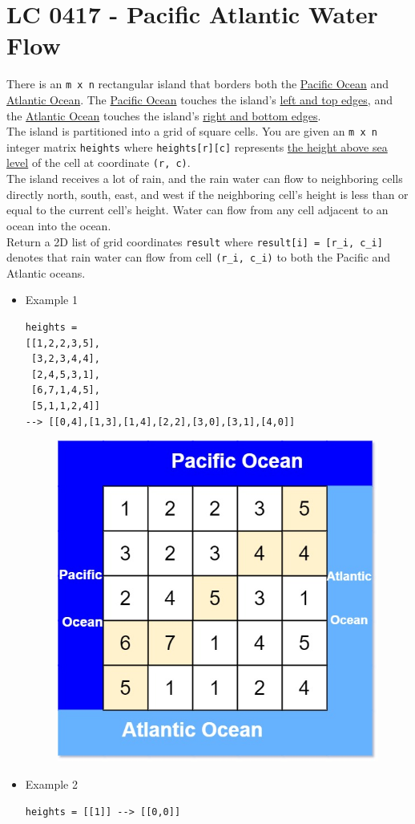 \section{LC 0417 - Pacific Atlantic Water Flow}
There is an {\colorbox{CodeBackground}{\lstinline|m x n|}} rectangular island that borders both the \ul{Pacific Ocean} and \ul{Atlantic Ocean}. The \ul{Pacific Ocean} touches the island's \ul{left and top edges}, and the \ul{Atlantic Ocean} touches the island's \ul{right and bottom edges}.\\

The island is partitioned into a grid of square cells. You are given an {\colorbox{CodeBackground}{\lstinline|m x n|}} integer matrix {\colorbox{CodeBackground}{\lstinline|heights|}} where {\colorbox{CodeBackground}{\lstinline|heights[r][c]|}} represents \ul{the height above sea level} of the cell at coordinate {\colorbox{CodeBackground}{\lstinline|(r, c)|}}.\\

The island receives a lot of rain, and the rain water can flow to neighboring cells directly north, south, east, and west if the neighboring cell's height is less than or equal to the current cell's height. Water can flow from any cell adjacent to an ocean into the ocean.\\

Return a 2D list of grid coordinates {\colorbox{CodeBackground}{\lstinline|result|}} where {\colorbox{CodeBackground}{\lstinline|result[i] = [r_i, c_i]|}} denotes that rain water can flow from cell {\colorbox{CodeBackground}{\lstinline|(r_i, c_i)|}} to both the Pacific and Atlantic oceans.\\

\begin{itemize}
\item Example 1
\begin{lstlisting}
heights = 
[[1,2,2,3,5],
 [3,2,3,4,4],
 [2,4,5,3,1],
 [6,7,1,4,5],
 [5,1,1,2,4]]
--> [[0,4],[1,3],[1,4],[2,2],[3,0],[3,1],[4,0]]
\end{lstlisting}
\begin{figure}[H]
\centering
\includegraphics[width=0.3\linewidth]{images/lc0417_eg}
\label{fig:lc0417eg}
\end{figure}
\item Example 2
\begin{lstlisting}
heights = [[1]] --> [[0,0]]
\end{lstlisting}
\end{itemize}


